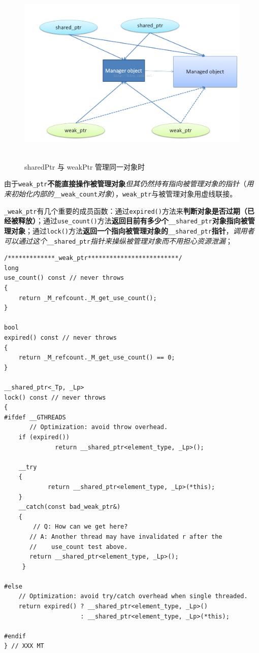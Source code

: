 \documentclass[UTF8,a4paper,12pt]{ctexbook}
\begin{document}
	\begin{figure}[H]
		\centering
		\includegraphics[width=15cm,height=9cm]{shared_weak_ptr}
		\caption{sharedPtr 与 weakPtr 管理同一对象时}
	\end{figure}
	
	由于\verb|weak_ptr|\textbf{不能直接操作被管理对象}\textit{但其仍然持有指向被管理对象的指针}（\textit{用来初始化内部的}\verb|__weak_count|\textit{对象}），\verb|weak_ptr|与被管理对象用虚线联接。
	
	\verb|_weak_ptr|有几个重要的成员函数：通过\verb|expired()|方法来\textbf{判断对象是否过期（已经被释放）}；通过\verb|use_count()|方法\textbf{返回目前有多少个}\verb|__shared_ptr|\textbf{对象指向被管理对象}；通过\verb|lock()|方法\textbf{返回一个指向被管理对象的}\verb|__shared_ptr|\textbf{指针}，\textit{调用者可以通过这个}\verb|__shared_ptr|\textit{指针来操纵被管理对象而不用担心资源泄漏}；
	
	\begin{lstlisting}
/*************_weak_ptr*************************/
long
use_count() const // never throws
{ 
	return _M_refcount._M_get_use_count(); 
}
 
bool
expired() const // never throws
{ 
	return _M_refcount._M_get_use_count() == 0; 
}
 
__shared_ptr<_Tp, _Lp>
lock() const // never throws
{
#ifdef __GTHREADS
       // Optimization: avoid throw overhead.
    if (expired())
              return __shared_ptr<element_type, _Lp>();
 
    __try
    {
            return __shared_ptr<element_type, _Lp>(*this);
    }
    __catch(const bad_weak_ptr&)
    {
        // Q: How can we get here?
       // A: Another thread may have invalidated r after the
       //    use_count test above.
       return __shared_ptr<element_type, _Lp>();
     }
    
#else
    // Optimization: avoid try/catch overhead when single threaded.
    return expired() ? __shared_ptr<element_type, _Lp>()
                     : __shared_ptr<element_type, _Lp>(*this);
 
#endif
} // XXX MT	
	\end{lstlisting}
	
\end{document}
